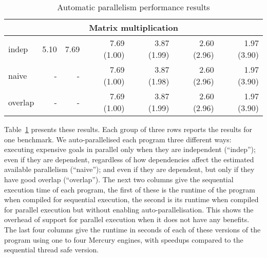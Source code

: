 \begin{table}[tb]
\begin{center}
\begin{tabular}{l|rr|rrrr}
\hline
\hline
\multicolumn{7}{c}{Matrix multiplication} \\
\hline
indep    & 5.10 & 7.69 & 7.69 (1.00) & 3.87 (1.99) & 2.60 (2.96) & 1.97 (3.90) \\
naive    &    - &    - & 7.69 (1.00) & 3.87 (1.98) & 2.60 (2.96) & 1.97 (3.90) \\
overlap  &    - &    - & 7.69 (1.00) & 3.87 (1.99) & 2.60 (2.96) & 1.97 (3.90) \\
\end{tabular}
\end{center}
\caption{Automatic parallelism performance results}
\label{tab:autopar}
\end{table}

Table~\ref{tab:autopar} presents these results.
Each group of three rows reports the results for one benchmark.
We auto-parallelised each program three different ways:
executing expensive goals in parallel
only when they are independent (``indep'');
even if they are dependent, regardless of how dependencies affect the
estimated available parallelism (``naive'');  and
even if they are dependent, but only if they have good overlap (``overlap'').
The next two columns give the sequential execution time of each program,
the first of these is the
runtime of the program when compiled for sequential execution,
the second is
its runtime when compiled for parallel execution
but without enabling auto-parallelisation.
This shows the overhead of support for parallel execution
when it does not have any benefits.
The last four columns give the runtime in seconds
of each of these versions of the program
using one to four Mercury engines,
with speedups compared to the sequential thread safe version.


